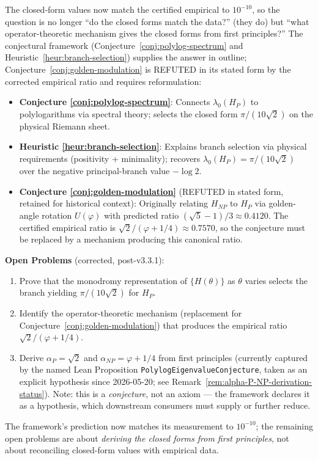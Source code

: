 \begin{remark}
The closed-form values now match the certified empirical to $10^{-10}$, so the question is no longer ``do the closed forms match the data?'' (they do) but ``what operator-theoretic mechanism gives the closed forms from first principles?'' The conjectural framework (Conjecture~\ref{conj:polylog-spectrum} and Heuristic~\ref{heur:branch-selection}) supplies the answer in outline; Conjecture~\ref{conj:golden-modulation} is REFUTED in its stated form by the corrected empirical ratio and requires reformulation:

\begin{itemize}
\item \textbf{Conjecture \ref{conj:polylog-spectrum}}: Connects $\lambda_0(H_P)$ to polylogarithms via spectral theory; selects the closed form $\pi/(10\sqrt{2})$ on the physical Riemann sheet.
\item \textbf{Heuristic \ref{heur:branch-selection}}: Explains branch selection via physical requirements (positivity + minimality); recovers $\lambda_0(H_P) = \pi/(10\sqrt{2})$ over the negative principal-branch value $-\log 2$.
\item \textbf{Conjecture \ref{conj:golden-modulation}} (REFUTED in stated form, retained for historical context): Originally relating $H_{NP}$ to $H_P$ via golden-angle rotation $U(\varphi)$ with predicted ratio $(\sqrt{5}-1)/3 \approx 0.4120$. The certified empirical ratio is $\sqrt{2}/(\varphi+1/4) \approx 0.7570$, so the conjecture must be replaced by a mechanism producing this canonical ratio.
\end{itemize}

\textbf{Open Problems} (corrected, post-v3.3.1):
\begin{enumerate}
\item Prove that the monodromy representation of $\{H(\theta)\}$ as $\theta$ varies selects the branch yielding $\pi/(10\sqrt{2})$ for $H_P$.
\item Identify the operator-theoretic mechanism (replacement for Conjecture~\ref{conj:golden-modulation}) that produces the empirical ratio $\sqrt{2}/(\varphi+1/4)$.
\item Derive $\alpha_P = \sqrt{2}$ and $\alpha_{NP} = \varphi + 1/4$ from first principles (currently captured by the named Lean Proposition \texttt{PolylogEigenvalueConjecture}, taken as an explicit hypothesis since 2026-05-20; see Remark~\ref{rem:alpha-P-NP-derivation-status}). Note: this is a \emph{conjecture}, not an axiom --- the framework declares it as a hypothesis, which downstream consumers must supply or further reduce.
\end{enumerate}

The framework's prediction now matches its measurement to $10^{-10}$; the remaining open problems are about \emph{deriving the closed forms from first principles}, not about reconciling closed-form values with empirical data.
\end{remark}

